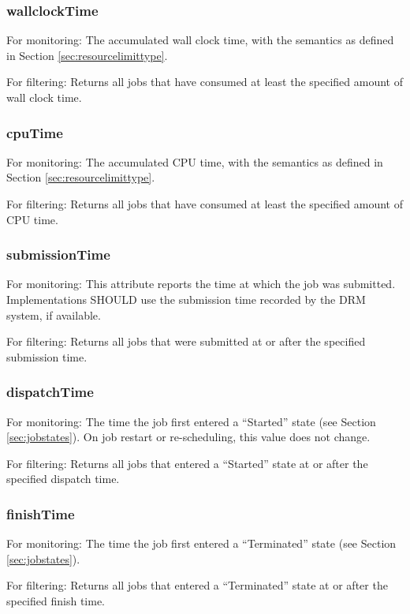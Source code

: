 \documentclass{article}
\begin{document}
\subsubsection{wallclockTime}

For monitoring: The accumulated wall clock time, with the semantics as defined in Section \ref{sec:resourcelimittype}.

For filtering: Returns all jobs that have consumed at least the specified amount of wall clock time.

\subsubsection{cpuTime}

For monitoring: The accumulated CPU time, with the semantics as defined in Section \ref{sec:resourcelimittype}.

For filtering: Returns all jobs that have consumed at least the specified amount of CPU time.

\subsubsection{submissionTime}

For monitoring: This attribute reports the time at which the job was submitted. Implementations SHOULD use the submission time recorded by the DRM system, if available.

For filtering: Returns all jobs that were submitted at or after the specified submission time.

\subsubsection{dispatchTime}

For monitoring: The time the job first entered a \enquote{Started} state (see Section \ref{sec:jobstates}). On job restart or re-scheduling, this value does not change.

For filtering: Returns all jobs that entered a \enquote{Started} state at or after the specified dispatch time.

\subsubsection{finishTime}

For monitoring: The time the job first entered a \enquote{Terminated} state (see Section \ref{sec:jobstates}).

For filtering: Returns all jobs that entered a \enquote{Terminated} state at or after the specified finish time.
\end{document}
